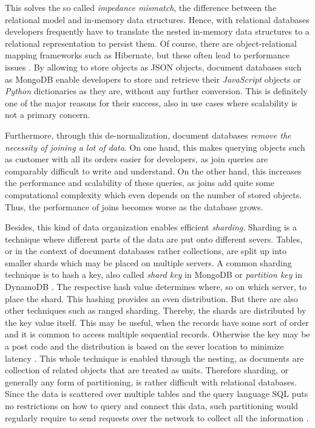 This solves the so called \emph{impedance mismatch}, the difference between the relational model and in-memory data structures. Hence, with relational databases developers frequently have to translate the nested in-memory data structures to a relational representation to persist them. Of course, there are object-relational mapping frameworks such as Hibernate, but these often lead to performance issues \cite{NoSQLDistilled}. By allowing to store objects as JSON objects, document databases such as MongoDB enable developers to store and retrieve their \emph{JavaScript} objects or \emph{Python} dictionaries as they are, without any further conversion. This is definitely one of the major reasons for their success, also in use cases where scalability is not a primary concern.\par
Furthermore, through this de-normalization, document databases \emph{remove the necessity of joining a lot of data}. On one hand, this makes querying objects such as customer with all its orders easier for developers, as join queries are comparably difficult to write and understand. On the other hand, this increases the performance and scalability of these queries, as joins add quite some computational complexity which even depends on the number of stored objects. Thus, the performance of joins becomes worse as the database grows.\par
Besides, this kind of data organization enables efficient \emph{sharding}. Sharding is a technique where different parts of the data are put onto different severs. Tables, or in the context of document databases rather collections, are split up into smaller shards which may be placed on multiple servers. A common sharding technique is to hash a key, also called \emph{shard key} in MongoDB \cite{MongoDBShardKey} or \emph{partition key} in DynamoDB \cite{DynamoDBPartitionKey}. The respective hash value determines where, so on which server, to place the shard. This hashing provides an even distribution. But there are also other techniques such as ranged sharding. Thereby, the shards are distributed by the key value itself. This may be useful, when the records have some sort of order and it is common to access multiple sequential records. Otherwise the key may be a post code and the distribution is based on the sever location to minimize latency \cite{NoSQLDistilled}. This whole technique is enabled through the nesting, as documents are collection of related objects that are treated as units. Therefore sharding, or generally any form of partitioning, is rather difficult with relational databases. Since the data is scattered over multiple tables and the query language SQL puts no restrictions on how to query and connect this data, such partitioning would regularly require to send requests over the network to collect all the information \cite{NoSQLDistilled}.\par 
